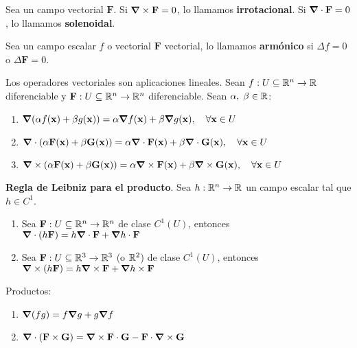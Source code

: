 \begin{definition}
    Sea un campo vectorial $\mathbf{F}$. Si $\grad\times\mathbf{F}=0$, lo llamamos \textbf{irrotacional}. Si $\grad\cdot\mathbf{F}=0$, lo llamamos \textbf{solenoidal}.
\end{definition}
\begin{definition}
    Sea un campo escalar $f$ o vectorial $\mathbf{F}$ vectorial, lo llamamos \textbf{arm\'onico} si $\Delta f=0$ o $\Delta \mathbf{F}=0$.
\end{definition}
\begin{propertie}
    Los operadores vectoriales son aplicaciones lineales. Sean $f:U\subseteq\mathbb{R}^n\to\mathbb{R}$ diferenciable y $\mathbf{F}:U\subseteq\mathbb{R}^n\to\mathbb{R}^n$ diferenciable. Sean $\alpha,\;\beta\in\mathbb{R}$:
    \begin{enumerate}
        \item \(\grad(\alpha f(\mathbf{x})+\beta g(\mathbf{x}))=\alpha\grad f(\mathbf{x})+\beta\grad g(\mathbf{x}),\quad\forall\mathbf{x}\in U\)
        \item \(\grad\cdot(\alpha \mathbf{F}(\mathbf{x})+\beta \mathbf{G}(\mathbf{x}))=\alpha\grad\cdot\mathbf{F}(\mathbf{x})+\beta\grad\cdot\mathbf{G}(\mathbf{x}),\quad\forall\mathbf{x}\in U\)
        \item \(\grad\times(\alpha \mathbf{F}(\mathbf{x})+\beta \mathbf{G}(\mathbf{x}))=\alpha\grad\times\mathbf{F}(\mathbf{x})+\beta\grad\times\mathbf{G}(\mathbf{x}),\quad\forall\mathbf{x}\in U\)
    \end{enumerate}
\end{propertie}
\begin{propertie}
    \textbf{Regla de Leibniz para el producto}. Sea $h:\mathbb{R}^n\to\mathbb{R}$ un campo escalar tal que $h\in C^1$.
    \begin{enumerate}
        \item Sea $\mathbf{F}:U\subseteq\mathbb{R}^n\to\mathbb{R}^n$ de clase $C^1(U)$, entonces $\grad\cdot(h\mathbf{F})=h\grad\cdot\mathbf{F}+\grad h\cdot\mathbf{F}$
        \item Sea $\mathbf{F}:U\subseteq\mathbb{R}^3\to\mathbb{R}^3$ (o $\mathbb{R}^2$) de clase $C^1(U)$, entonces $\grad\times(h\mathbf{F})=h\grad\times\mathbf{F}+\grad h\times\mathbf{F}$
    \end{enumerate}
\end{propertie}
\begin{propertie}
    Productos:
    \begin{enumerate}
        \item $\grad(fg)=f\grad g+g\grad f$
        \item $\grad\cdot(\mathbf{F}\times\mathbf{G})=\grad\times\mathbf{F}\cdot\mathbf{G}-\mathbf{F}\cdot\grad\times\mathbf{G}$
    \end{enumerate}
\end{propertie}
